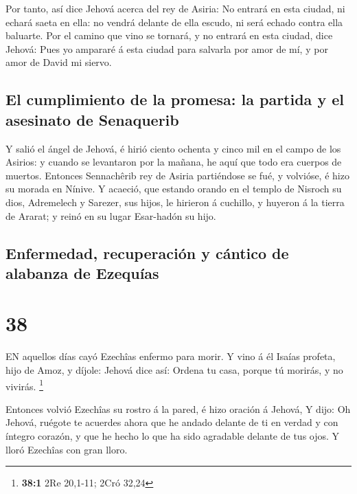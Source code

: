  Por tanto, así dice Jehová acerca del rey de Asiria: No
entrará en esta ciudad, ni echará saeta en ella: no vendrá delante de
ella escudo, ni será echado contra ella baluarte.  Por el
camino que vino se tornará, y no entrará en esta ciudad, dice Jehová:
 Pues yo ampararé á esta ciudad para salvarla por amor de
mí, y por amor de David mi siervo.

\hypertarget{el-cumplimiento-de-la-promesa-la-partida-y-el-asesinato-de-senaquerib}{%
\subsection{El cumplimiento de la promesa: la partida y el asesinato de
Senaquerib}\label{el-cumplimiento-de-la-promesa-la-partida-y-el-asesinato-de-senaquerib}}

 Y salió el ángel de Jehová, é hirió ciento ochenta y cinco
mil en el campo de los Asirios: y cuando se levantaron por la mañana, he
aquí que todo era cuerpos de muertos.  Entonces Sennachêrib
rey de Asiria partiéndose se fué, y volvióse, é hizo su morada en
Nínive.  Y acaeció, que estando orando en el templo de
Nisroch su dios, Adremelech y Sarezer, sus hijos, le hirieron á
cuchillo, y huyeron á la tierra de Ararat; y reinó en su lugar
Esar-hadón su hijo.

\hypertarget{enfermedad-recuperaciuxf3n-y-cuxe1ntico-de-alabanza-de-ezequuxedas}{%
\subsection{Enfermedad, recuperación y cántico de alabanza de
Ezequías}\label{enfermedad-recuperaciuxf3n-y-cuxe1ntico-de-alabanza-de-ezequuxedas}}

\hypertarget{section-37}{%
\section{38}\label{section-37}}

 EN aquellos días cayó Ezechîas enfermo para morir. Y vino á
él Isaías profeta, hijo de Amoz, y díjole: Jehová dice así: Ordena tu
casa, porque tú morirás, y no vivirás. \footnote{\textbf{38:1} 2Re
  20,1-11; 2Cró 32,24}

 Entonces volvió Ezechîas su rostro á la pared, é hizo
oración á Jehová,  Y dijo: Oh Jehová, ruégote te acuerdes
ahora que he andado delante de ti en verdad y con íntegro corazón, y que
he hecho lo que ha sido agradable delante de tus ojos. Y lloró Ezechîas
con gran lloro.

